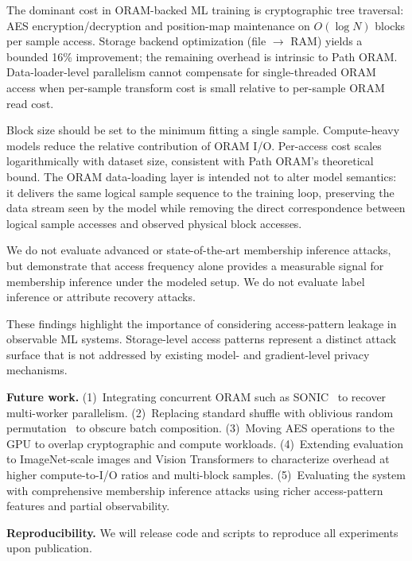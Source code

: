 \documentclass{llncs}
\begin{document}
The dominant cost in ORAM-backed ML training is cryptographic tree traversal: AES encryption/decryption and position-map maintenance on $O(\log N)$ blocks per sample access.
Storage backend optimization (file $\to$ RAM) yields a bounded 16\% improvement; the remaining overhead is intrinsic to Path ORAM.
Data-loader-level parallelism cannot compensate for single-threaded ORAM access when per-sample transform cost is small relative to per-sample ORAM read cost.

Block size should be set to the minimum fitting a single sample.
Compute-heavy models reduce the relative contribution of ORAM I/O.
Per-access cost scales logarithmically with dataset size, consistent with Path ORAM's theoretical bound.
The ORAM data-loading layer is intended not to alter model semantics: it delivers the same logical sample sequence to the training loop, preserving the data stream seen by the model while removing the direct correspondence between logical sample accesses and observed physical block accesses.

We do not evaluate advanced or state-of-the-art membership inference attacks, but demonstrate that access frequency alone provides a measurable signal for membership inference under the modeled setup.
We do not evaluate label inference or attribute recovery attacks.

These findings highlight the importance of considering access-pattern leakage in observable ML systems.
Storage-level access patterns represent a distinct attack surface that is not addressed by existing model- and gradient-level privacy mechanisms.

\medskip
\noindent\textbf{Future work.}
(1)~Integrating concurrent ORAM such as SONIC~\cite{talur2026} to recover multi-worker parallelism.
(2)~Replacing standard shuffle with oblivious random permutation~\cite{ngai2024} to obscure batch composition.
(3)~Moving AES operations to the GPU to overlap cryptographic and compute workloads.
(4)~Extending evaluation to ImageNet-scale images and Vision Transformers to characterize overhead at higher compute-to-I/O ratios and multi-block samples.
(5)~Evaluating the system with comprehensive membership inference attacks using richer access-pattern features and partial observability.

\medskip
\noindent\textbf{Reproducibility.}
We will release code and scripts to reproduce all experiments upon publication.
\end{document}
